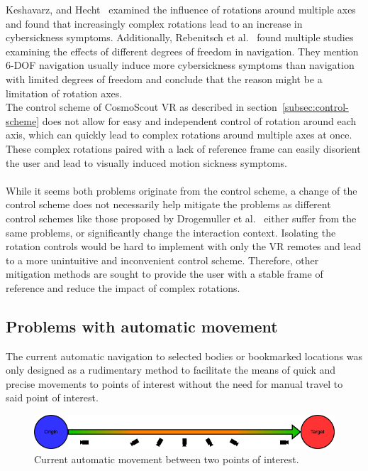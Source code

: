 Keshavarz, and Hecht~\cite{Keshavarz2011b} examined the influence of rotations around multiple axes and found that
increasingly complex rotations lead to an increase in cybersickness symptoms.
Additionally, Rebenitsch et al.~\cite{Rebenitsch2016} found multiple studies examining the effects of different
degrees of freedom in navigation.
They mention 6-DOF navigation usually induce more cybersickness symptoms than navigation with limited degrees of
freedom and conclude that the reason might be a limitation of rotation axes.
\\
The control scheme of CosmoScout VR as described in section~\ref{subsec:control-scheme} does not allow for easy and
independent control of rotation around each axis, which can quickly lead to complex rotations around multiple axes at
once.
These complex rotations paired with a lack of reference frame can easily disorient the user and lead to visually
induced motion sickness symptoms.
\\
\\
While it seems both problems originate from the control scheme, a change of the control scheme does not necessarily
help mitigate the problems as different control schemes like those proposed by Drogemuller et al.~\cite{Drogemuller2020}
either suffer from the same problems, or significantly change the interaction context.
Isolating the rotation controls would be hard to implement with only the VR remotes and lead to a more unintuitive
and inconvenient control scheme.
Therefore, other mitigation methods are sought to provide the user with a stable frame of reference and reduce the
impact of complex rotations.


\subsection{Problems with automatic movement}\label{subsec:problems-with-automatic-movement}

The current automatic navigation to selected bodies or bookmarked locations was only designed as a rudimentary method
to facilitate the means of quick and precise movements to points of interest without the need for manual travel to
said point of interest.

\begin{figure}[h]
    \centering
    \includegraphics[width=\textwidth]{content/3_current_state/img/OldAutomaticNavigation}
    \caption{Current automatic movement between two points of interest.}
    \label{fig:old-auto-nav}
\end{figure}

